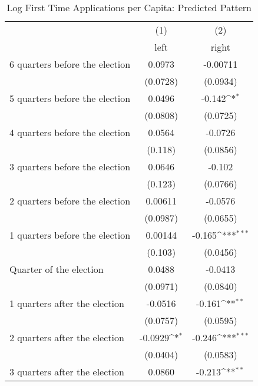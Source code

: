 \begin{table}[htbp]\centering
\def\sym#1{\ifmmode^{#1}\else\(^{#1}\)\fi}
\caption{Log First Time Applications per Capita: Predicted Pattern}
\begin{tabular}{l*{2}{c}}
\hline\hline
                    &\multicolumn{1}{c}{(1)}&\multicolumn{1}{c}{(2)}\\
                    &\multicolumn{1}{c}{left}&\multicolumn{1}{c}{right}\\
\hline
 6 quarters before the election&      0.0973         &    -0.00711         \\
                    &    (0.0728)         &    (0.0934)         \\
[1em]
 5 quarters before the election&      0.0496         &      -0.142\sym{*}  \\
                    &    (0.0808)         &    (0.0725)         \\
[1em]
 4 quarters before the election&      0.0564         &     -0.0726         \\
                    &     (0.118)         &    (0.0856)         \\
[1em]
 3 quarters before the election&      0.0646         &      -0.102         \\
                    &     (0.123)         &    (0.0766)         \\
[1em]
 2 quarters before the election&     0.00611         &     -0.0576         \\
                    &    (0.0987)         &    (0.0655)         \\
[1em]
 1 quarters before the election&     0.00144         &      -0.165\sym{***}\\
                    &     (0.103)         &    (0.0456)         \\
[1em]
Quarter of the election&      0.0488         &     -0.0413         \\
                    &    (0.0971)         &    (0.0840)         \\
[1em]
 1 quarters after the election&     -0.0516         &      -0.161\sym{**} \\
                    &    (0.0757)         &    (0.0595)         \\
[1em]
 2 quarters after the election&     -0.0929\sym{*}  &      -0.246\sym{***}\\
                    &    (0.0404)         &    (0.0583)         \\
[1em]
 3 quarters after the election&      0.0860         &      -0.213\sym{**} \\

\end{tabular}
\end{table}
